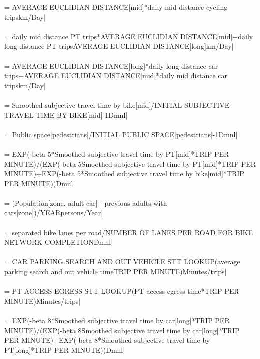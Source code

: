  = {\small AVERAGE EUCLIDIAN DISTANCE[mid]*daily mid distance cycling tripskm/Day|} \\ \\ 
 = {\small daily mid distance PT trips*AVERAGE EUCLIDIAN DISTANCE[mid]+daily long distance PT trips\*AVERAGE EUCLIDIAN DISTANCE[long]km/Day|} \\ \\ 
 = {\small AVERAGE EUCLIDIAN DISTANCE[long]*daily long distance car trips+AVERAGE EUCLIDIAN DISTANCE[mid]*daily mid distance car tripskm/Day|} \\ \\ 
 = {\small Smoothed subjective travel time by bike[mid]/INITIAL SUBJECTIVE TRAVEL TIME BY BIKE[mid]-1Dmnl|} \\ \\ 
 = {\small Public space[pedestrians]/INITIAL PUBLIC SPACE[pedestrians]-1Dmnl|} \\ \\ 
 = {\small EXP(-beta 5*Smoothed subjective travel time by PT[mid]*TRIP PER MINUTE)/(EXP(-beta 5\*Smoothed subjective travel time by PT[mid]*TRIP PER MINUTE)+EXP(-beta 5*Smoothed subjective travel time by bike[mid]*TRIP PER MINUTE))Dmnl|} \\ \\ 
 = {\small (Population[zone, adult car] - previous adults with cars[zone])/YEARpersons/Year|} \\ \\ 
 = {\small separated bike lanes per road/NUMBER OF LANES PER ROAD FOR BIKE NETWORK COMPLETIONDmnl|} \\ \\ 
 = {\small CAR PARKING SEARCH AND OUT VEHICLE STT LOOKUP(average parking search and out vehicle time\*TRIP PER MINUTE)Minutes/trips|} \\ \\ 
 = {\small PT ACCESS EGRESS STT LOOKUP(PT access egress time*TRIP PER MINUTE)Minutes/trips|} \\ \\ 
 = {\small EXP(-beta 8*Smoothed subjective travel time by car[long]*TRIP PER MINUTE)/(EXP(-beta 8\*Smoothed subjective travel time by car[long]*TRIP PER MINUTE)+EXP(-beta 8*Smoothed subjective travel time by PT[long]*TRIP PER MINUTE))Dmnl|} \\ \\ 
